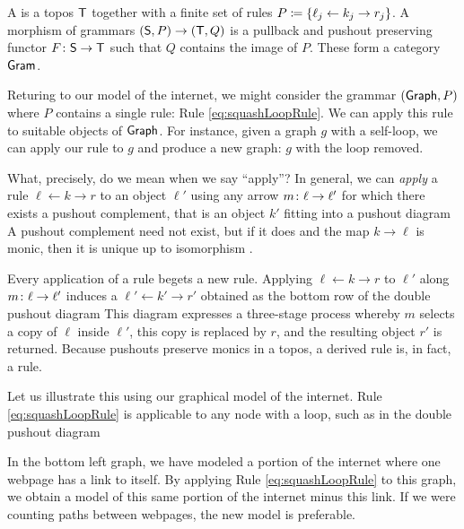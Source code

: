 \documentclass{amsart}
\begin{document}
\begin{definition}[Grammar] \label{def:grammar} A
   is a topos $ \mathsf{T} $ together with a
  finite set of rules
  $ P \coloneqq \{ \ell_j \leftarrow k_j \to r_j \} $. A
  morphism of grammars
  $ ( \mathsf{S} , P ) \to ( \mathsf{T} , Q ) $ is a pullback
  and pushout preserving functor
  $ F \colon \mathsf{S} \to \mathsf{T} $ such that $ Q $
  contains the image of $ P $. These form a
  category $ \mathsf{Gram} $.
\end{definition}

Returing to our model of the internet, we might consider the
grammar $ ( \mathsf{Graph}, P ) $ where $ P $ contains a single
rule: Rule \eqref{eq:squashLoopRule}. We can apply this rule
to suitable objects of $ \mathsf{Graph} $.  For instance, given a
graph $g$ with a self-loop, we can apply our rule to $ g $
and produce a new graph: $ g $ with the loop removed.

What, precisely, do we mean when we say ``apply''?
In general, we can \emph{apply} a rule
$ \ell \gets k \to r $ to an object $ \ell' $
using any arrow $ m \colon \ell \to \ell' $ for
which there exists a pushout complement, that is
an object $ k' $ fitting into a pushout diagram
 A pushout
complement need not exist, but if it does and the
map $ k \to \ell $ is monic, then it is unique up to isomorphism
\cite[Lem.~15]{LackSobo_Adhesive}.

Every application of a rule begets a new rule. Applying
$ \ell \gets k \to r $ to $\ell'$ along
$ m \colon \ell \to \ell' $ induces a 
$ \ell' \gets k' \to r' $ obtained as the bottom row of the
double pushout diagram  This diagram expresses a three-stage process whereby
$ m $ selects a copy of $ \ell $ inside $ \ell' $, this copy
is replaced by $ r $, and the resulting object $ r' $ is
returned.  Because pushouts preserve monics in a topos, a
derived rule is, in fact, a rule.

Let us illustrate this using our graphical model
of the internet.  Rule \eqref{eq:squashLoopRule}
is applicable to any node with a loop, such as in
the double pushout diagram

In the bottom left graph, we have modeled a
portion of the internet where one webpage has a
link to itself.  By applying Rule
\eqref{eq:squashLoopRule} to this graph, we obtain
a model of this same portion of the internet minus
this link. If we were counting paths between
webpages, the new model is preferable.  
\end{document}
